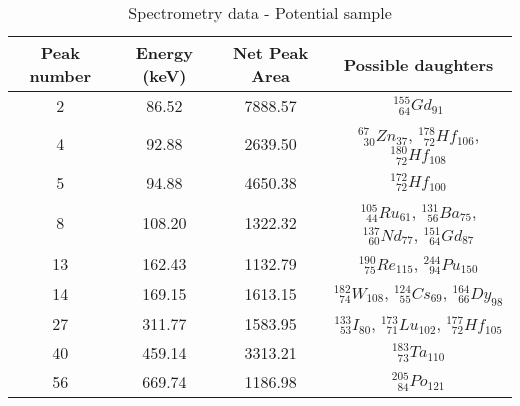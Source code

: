 \renewcommand{\arraystretch}{2}
\begin{table}[!htb]
    \centering
        \begin{tabular}{cccc}
        \hline
        Peak number & Energy (keV) & Net Peak Area & Possible daughters \\ \hline\hline
		2           & 86.52        & 7888.57       & $^{155}_{\phantom{0}64}Gd_{91}$ \\
		4           & 92.88        & 2639.50       & $^{67}_{\phantom{0}30}Zn_{37}$, $^{178}_{\phantom{0}72}Hf_{106}$, $^{180}_{\phantom{0}72}Hf_{108}$ \\
		5           & 94.88        & 4650.38       & $^{172}_{\phantom{0}72}Hf_{100}$ \\
		8           & 108.20       & 1322.32       & $^{105}_{\phantom{0}44}Ru_{61}$, $^{131}_{\phantom{0}56}Ba_{75}$, $^{137}_{\phantom{0}60}Nd_{77}$, $^{151}_{\phantom{0}64}Gd_{87}$ \\
		13          & 162.43       & 1132.79       & $^{190}_{\phantom{0}75}Re_{115}$, $^{244}_{\phantom{0}94}Pu_{150}$ \\
		14          & 169.15       & 1613.15       & $^{182}_{\phantom{0}74}W_{108}$, $^{124}_{\phantom{0}55}Cs_{69}$, $^{164}_{\phantom{0}66}Dy_{98}$ \\
		27          & 311.77       & 1583.95       & $^{133}_{\phantom{0}53}I_{80}$, $^{173}_{\phantom{0}71}Lu_{102}$, $^{177}_{\phantom{0}72}Hf_{105}$\\
		40          & 459.14       & 3313.21       & $^{183}_{\phantom{0}73}Ta_{110}$\\
		56          & 669.74       & 1186.98       & $^{205}_{\phantom{0}84}Po_{121}$
        \end{tabular}
        \caption{Spectrometry data - Potential sample}\label{tab:specdata_d}
\end{table}


\
